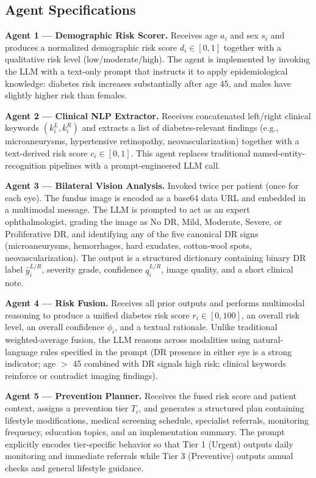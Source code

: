 \documentclass[11pt,a4paper]{article}
\begin{document}
\subsection{Agent Specifications}

\textbf{Agent 1 --- Demographic Risk Scorer.} Receives age $a_i$ and sex $s_i$ and produces a normalized demographic risk score $d_i \in [0, 1]$ together with a qualitative risk level (low/moderate/high). The agent is implemented by invoking the LLM with a text-only prompt that instructs it to apply epidemiological knowledge: diabetes risk increases substantially after age 45, and males have slightly higher risk than females.

\textbf{Agent 2 --- Clinical NLP Extractor.} Receives concatenated left/right clinical keywords $(k_i^L, k_i^R)$ and extracts a list of diabetes-relevant findings (e.g., microaneurysms, hypertensive retinopathy, neovascularization) together with a text-derived risk score $c_i \in [0, 1]$. This agent replaces traditional named-entity-recognition pipelines with a prompt-engineered LLM call.

\textbf{Agent 3 --- Bilateral Vision Analysis.} Invoked twice per patient (once for each eye). The fundus image is encoded as a base64 data URL and embedded in a multimodal message. The LLM is prompted to act as an expert ophthalmologist, grading the image as No DR, Mild, Moderate, Severe, or Proliferative DR, and identifying any of the five canonical DR signs (microaneurysms, hemorrhages, hard exudates, cotton-wool spots, neovascularization). The output is a structured dictionary containing binary DR label $\hat{y}_i^{L/R}$, severity grade, confidence $q_i^{L/R}$, image quality, and a short clinical note.

\textbf{Agent 4 --- Risk Fusion.} Receives all prior outputs and performs multimodal reasoning to produce a unified diabetes risk score $r_i \in [0, 100]$, an overall risk level, an overall confidence $\phi_i$, and a textual rationale. Unlike traditional weighted-average fusion, the LLM reasons across modalities using natural-language rules specified in the prompt (DR presence in either eye is a strong indicator; age $>$ 45 combined with DR signals high risk; clinical keywords reinforce or contradict imaging findings).

\textbf{Agent 5 --- Prevention Planner.} Receives the fused risk score and patient context, assigns a prevention tier $T_i$, and generates a structured plan containing lifestyle modifications, medical screening schedule, specialist referrals, monitoring frequency, education topics, and an implementation summary. The prompt explicitly encodes tier-specific behavior so that Tier 1 (Urgent) outputs daily monitoring and immediate referrals while Tier 3 (Preventive) outputs annual checks and general lifestyle guidance.
\end{document}
